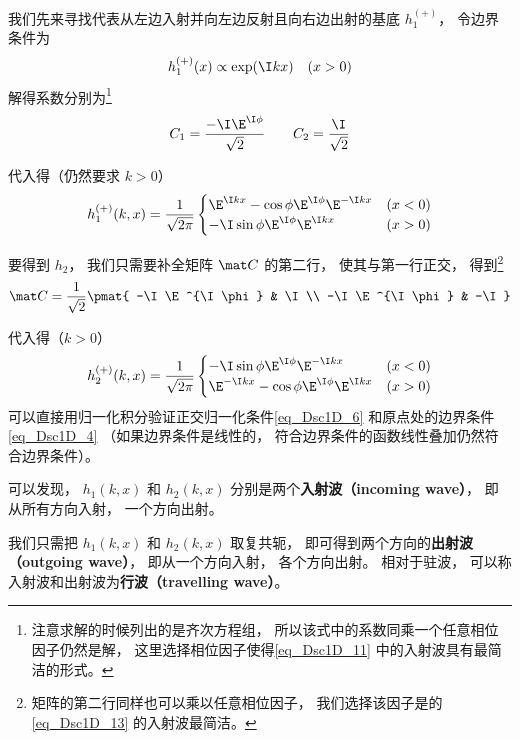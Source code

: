 我们先来寻找代表从左边入射并向左边反射且向右边出射的基底 $h_1^{(+)}$， 令边界条件为
\begin{equation}
h_1^{(+)}(x) \propto \exp(\I k x) \quad (x > 0)
\end{equation}
解得系数分别为\footnote{注意求解的时候列出的是齐次方程组， 所以该式中的系数同乘一个任意相位因子仍然是解， 这里选择相位因子使得\autoref{eq_Dsc1D_11} 中的入射波具有最简洁的形式。}
\begin{equation}
C_1 = \frac{-\I\E^{\I \phi}}{\sqrt{2}} \qquad
C_2 =  \frac{\I}{\sqrt{2}}
\end{equation}

代入得（仍然要求 $k > 0$）
\begin{equation}\label{eq_Dsc1D_11}
h_1^{(+)}(k, x) =  \frac{1}{\sqrt{2\pi}}
\begin{cases}
\E^{\I kx} - \cos\phi \E^{\I\phi} \E^{-\I k x} & (x < 0) \\
-\I\sin\phi\E^{\I\phi} \E^{\I kx}  & (x > 0)
\end{cases}
\end{equation}

要得到 $h_2$， 我们只需要补全矩阵 $\mat C$ 的第二行， 使其与第一行正交， 得到\footnote{矩阵的第二行同样也可以乘以任意相位因子， 我们选择该因子是的\autoref{eq_Dsc1D_13} 的入射波最简洁。}
\begin{equation}
\mat C = \frac{1}{\sqrt{2}}\pmat{
-\I\E^{\I \phi} & \I \\
-\I\E^{\I \phi} & -\I
}\end{equation}

代入得（$k > 0$）
\begin{equation}\label{eq_Dsc1D_13}
h_2^{(+)}(k, x) =  \frac{1}{\sqrt{2\pi}}
\begin{cases}
-\I\sin\phi\E^{\I\phi}\E^{-\I kx} &(x < 0) \\
\E^{-\I kx} - \cos\phi \E^{\I \phi} \E^{\I kx} &(x > 0)
\end{cases}
\end{equation}
可以直接用归一化积分验证正交归一化条件\autoref{eq_Dsc1D_6} 和原点处的边界条件\autoref{eq_Dsc1D_4} （如果边界条件是线性的， 符合边界条件的函数线性叠加仍然符合边界条件）。

可以发现， $h_1(k, x)$ 和 $h_2(k, x)$ 分别是两个\textbf{入射波（incoming wave）}， 即从所有方向入射， 一个方向出射。

我们只需把 $h_1(k, x)$ 和 $h_2(k, x)$ 取复共轭， 即可得到两个方向的\textbf{出射波（outgoing wave）}， 即从一个方向入射， 各个方向出射。 相对于驻波， 可以称入射波和出射波为\textbf{行波（travelling wave）}。

